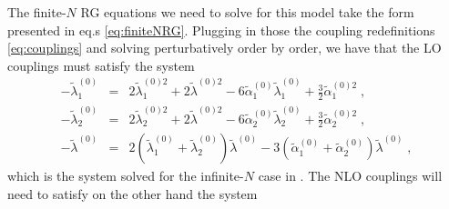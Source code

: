 \noindent
The finite-$N$ RG equations we need to solve for this model take the form presented in eq.s \eqref{eq:finiteNRG}. Plugging in those the coupling redefinitions \eqref{eq:couplings} and solving perturbatively order by order, we have that the LO couplings must satisfy the system
\begin{align}
-\tilde\lambda^{(0)}_1&=&2\tilde\lambda^{(0)2}_1+2\tilde\lambda^{(0)2}-6\tilde\alpha^{(0)}_1\tilde\lambda^{(0)}_1+\frac{3}{2}\tilde\alpha_1^{(0)2}\;,\\
-\tilde\lambda^{(0)}_2&=&2\tilde\lambda_2^{(0)2}+2\tilde\lambda^{(0)2}-6\tilde\alpha^{(0)}_2\tilde\lambda^{(0)}_2+\frac{3}{2}\tilde\alpha_2^{(0)2}\;,\\
-\tilde\lambda^{(0)}&=&2\left(\tilde\lambda^{(0)}_1+\tilde\lambda^{(0)}_2\right)\tilde\lambda^{(0)}-3\left(\tilde\alpha^{(0)}_1+\tilde\alpha^{(0)}_2\right)\tilde\lambda^{(0)}\; ,
\end{align}
which is the system solved for the infinite-$N$ case in \cite{Bajc:2021}.  The NLO couplings will need to satisfy on the other hand the system
